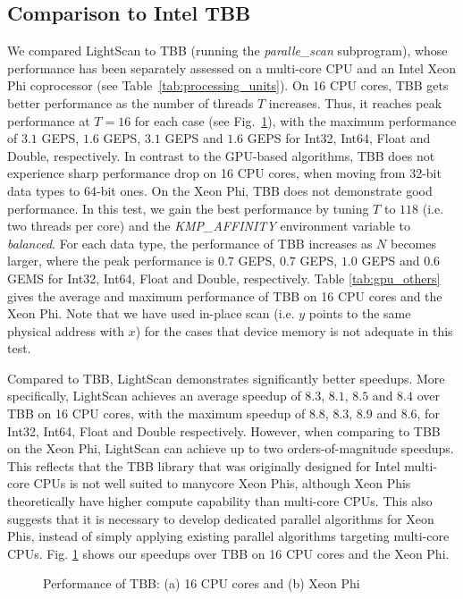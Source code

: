 \documentclass[article]{elsarticle}
\begin{document}
{\subsection{Comparison to Intel TBB}
We compared LightScan to TBB (running the \textit{paralle\_scan} subprogram), whose performance has been separately assessed on a multi-core CPU and an Intel Xeon Phi coprocessor (see Table~\ref{tab:processing_units}). On 16 CPU cores, TBB gets better performance as the number of threads $T$ increases. Thus, it reaches peak performance at $T=16$ for each case (see Fig.~\ref{fig:tbb}), with the maximum performance of $3.1$ GEPS, $1.6$ GEPS, $3.1$ GEPS and $1.6$ GEPS for Int32, Int64, Float and Double, respectively. In contrast to the GPU-based algorithms, TBB does not experience sharp performance drop on 16 CPU cores, when moving from 32-bit data types to 64-bit ones. On the Xeon Phi, TBB does not demonstrate good performance. In this test, we gain the best performance by tuning $T$ to $118$ (i.e. two threads per core) and the \textit{KMP\_AFFINITY} environment variable to \textit{balanced}. For each data type, the performance of TBB increases as $N$ becomes larger, where the peak performance is $0.7$ GEPS, $0.7$ GEPS, $1.0$ GEPS and $0.6$ GEMS for Int32, Int64, Float and Double, respectively. Table \ref{tab:gpu_others} gives the average and maximum performance of TBB on 16 CPU cores and the Xeon Phi. Note that we have used in-place scan (i.e. $y$ points to the same physical address with $x$) for the cases that device memory is not adequate in this test.

Compared to TBB, LightScan demonstrates significantly better speedups. More specifically, LightScan achieves an average speedup of $8.3$, $8.1$, $8.5$ and $8.4$ over TBB on 16 CPU cores, with the maximum speedup of $8.8$, $8.3$, $8.9$ and $8.6$, for Int32, Int64, Float and Double respectively. However, when comparing to TBB on the Xeon Phi, LightScan can achieve up to two orders-of-magnitude speedups. This reflects that the TBB library that was originally designed for Intel multi-core CPUs is not well suited to manycore Xeon Phis, although Xeon Phis theoretically have higher compute capability than multi-core CPUs. This also suggests that it is necessary to develop dedicated parallel algorithms for Xeon Phis, instead of simply applying existing parallel algorithms targeting multi-core CPUs. Fig. \ref{fig:tbb} shows our speedups over TBB on 16 CPU cores and the Xeon Phi.
\begin{figure}[!h]
\centering
\begin{minipage}[b]{0.49\linewidth}
\end{minipage}
\begin{minipage}[b]{0.49\linewidth}
\end{minipage}
\caption{Performance of TBB: (a) 16 CPU cores and (b) Xeon Phi}
\label{fig:tbb}
\end{figure}
}
\end{document}
